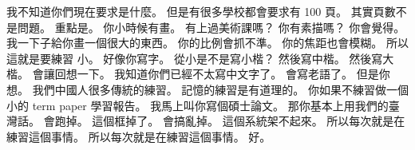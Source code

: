\hypertarget{w01:cue:132}{}我不知道你們現在要求是什麼。
\hypertarget{w01:cue:133}{}但是有很多學校都會要求有 100 頁。
\hypertarget{w01:cue:134}{}其實頁數不是問題。
\hypertarget{w01:cue:135}{}重點是。
\hypertarget{w01:cue:136}{}你小時候有畫。
\hypertarget{w01:cue:137}{}有上過美術課嗎？
\hypertarget{w01:cue:138}{}你有素描嗎？
\hypertarget{w01:cue:139}{}你會覺得。
\hypertarget{w01:cue:140}{}我一下子給你畫一個很大的東西。
\hypertarget{w01:cue:141}{}你的比例會抓不準。
\hypertarget{w01:cue:142}{}你的焦距也會模糊。
\hypertarget{w01:cue:143}{}所以這就是要練習
\hypertarget{w01:cue:144}{}小。
\hypertarget{w01:cue:145}{}好像你寫字。
\hypertarget{w01:cue:146}{}從小是不是寫小楷？
\hypertarget{w01:cue:147}{}然後寫中楷。
\hypertarget{w01:cue:148}{}然後寫大楷。
\hypertarget{w01:cue:149}{}會讓回想一下。
\hypertarget{w01:cue:150}{}我知道你們已經不太寫中文字了。
\hypertarget{w01:cue:151}{}會寫老語了。
\hypertarget{w01:cue:152}{}但是你想。
\hypertarget{w01:cue:153}{}我們中國人很多傳統的練習。
\hypertarget{w01:cue:154}{}記憶的練習是有道理的。
\hypertarget{w01:cue:155}{}你如果不練習做一個小的 term paper 學習報告。
\hypertarget{w01:cue:156}{}我馬上叫你寫個碩士論文。
\hypertarget{w01:cue:157}{}那你基本上用我們的臺灣話。
\hypertarget{w01:cue:158}{}會跑掉。
\hypertarget{w01:cue:159}{}這個框掉了。
\hypertarget{w01:cue:160}{}會搞亂掉。
\hypertarget{w01:cue:161}{}這個系統架不起來。
\hypertarget{w01:cue:162}{}所以每次就是在練習這個事情。
\hypertarget{w01:cue:163}{}所以每次就是在練習這個事情。
\hypertarget{w01:cue:164}{}好。

